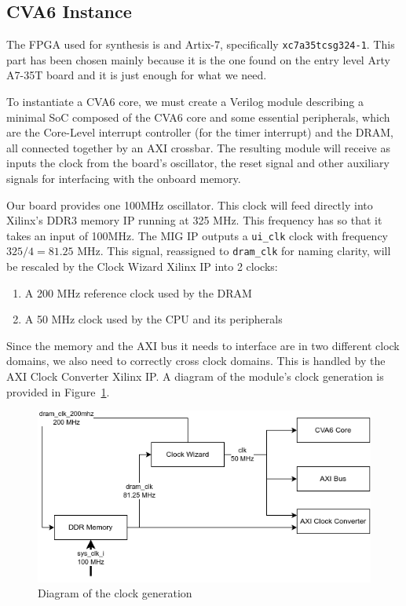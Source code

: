 \documentclass[a4paper,11pt]{article}
\begin{document}
\subsection{CVA6 Instance}

The FPGA used for synthesis is and Artix-7, specifically
\texttt{xc7a35tcsg324-1}. This part has been chosen mainly because it is the one
found on the entry level Arty A7-35T board and it is just enough for what we
need.

To instantiate a CVA6 core, we must create a Verilog module describing a minimal
SoC composed of the CVA6 core and some essential peripherals, which are the
Core-Level interrupt controller (for the timer interrupt) and the DRAM, all
connected together by an AXI crossbar. The resulting module will receive as inputs
the clock from the board's oscillator, the reset signal and other auxiliary signals
for interfacing with the onboard memory.

Our board provides one 100MHz oscillator. This clock will feed directly into
Xilinx's DDR3 memory IP running at 325 MHz. This frequency has so that it takes an input of
100MHz. The MIG IP outputs a \texttt{ui\_clk} clock with frequency $325 / 4 = 81.25$
MHz. This signal, reassigned to \texttt{dram\_clk} for naming clarity, will be
rescaled by the Clock Wizard Xilinx IP into 2 clocks:

\begin{enumerate}
  \item A 200 MHz reference clock used by the DRAM
  \item A 50 MHz clock used by the CPU and its peripherals
\end{enumerate}

Since the memory and the AXI bus it needs to interface are in two different
clock domains, we also need to correctly cross clock domains. This is handled by
the AXI Clock Converter Xilinx IP. A diagram of the module's clock generation is
provided in Figure~\ref{clock-diag}.

\begin{figure}
  \centering
  \includegraphics[width=\textwidth]{./img/clocking_diagram.png}
  \caption{Diagram of the clock generation}%
  \label{clock-diag}
\end{figure}
\end{document}
